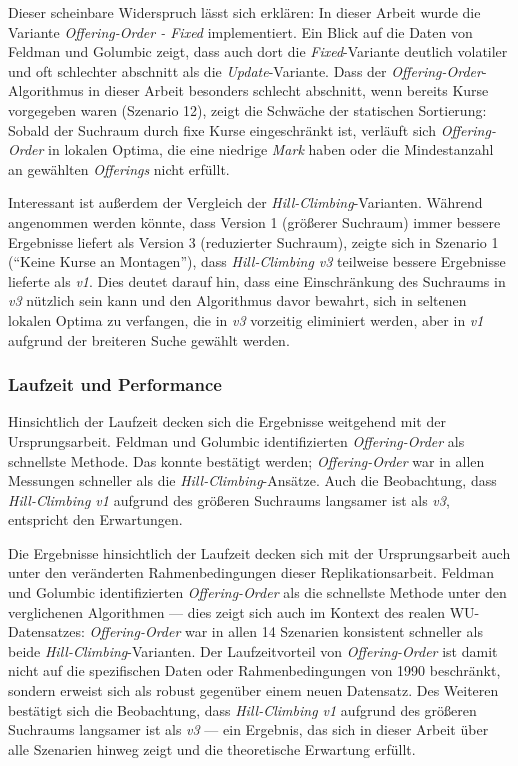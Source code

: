 Dieser scheinbare Widerspruch lässt sich erklären: In dieser Arbeit wurde die Variante \textit{Offering-Order - Fixed} implementiert. Ein Blick auf die Daten von Feldman und Golumbic zeigt, dass auch dort die \textit{Fixed}-Variante deutlich volatiler und oft schlechter abschnitt als die \textit{Update}-Variante. Dass der \textit{Offering-Order}-Algorithmus in dieser Arbeit besonders schlecht abschnitt, wenn bereits Kurse vorgegeben waren (Szenario 12), zeigt die Schwäche der statischen Sortierung: Sobald der Suchraum durch fixe Kurse eingeschränkt ist, verläuft sich \textit{Offering-Order} in lokalen Optima, die eine niedrige \textit{Mark} haben oder die Mindestanzahl an gewählten \textit{Offerings} nicht erfüllt.

Interessant ist außerdem der Vergleich der \textit{Hill-Climbing}-Varianten. Während angenommen werden könnte, dass Version 1 (größerer Suchraum) immer bessere Ergebnisse liefert als Version 3 (reduzierter Suchraum), zeigte sich in Szenario 1 (\enquote{Keine Kurse an Montagen}), dass \textit{Hill-Climbing v3} teilweise bessere Ergebnisse lieferte als \textit{v1}. Dies deutet darauf hin, dass eine Einschränkung des Suchraums in \textit{v3} nützlich sein kann und den Algorithmus davor bewahrt, sich in seltenen lokalen Optima zu verfangen, die in \textit{v3} vorzeitig eliminiert werden, aber in \textit{v1} aufgrund der breiteren Suche gewählt werden.


\subsubsection{Laufzeit und Performance}

Hinsichtlich der Laufzeit decken sich die Ergebnisse weitgehend mit der Ursprungsarbeit. Feldman und Golumbic identifizierten \textit{Offering-Order} als schnellste Methode. Das konnte bestätigt werden; \textit{Offering-Order} war in allen Messungen schneller als die \textit{Hill-Climbing}-Ansätze. Auch die Beobachtung, dass \textit{Hill-Climbing v1} aufgrund des größeren Suchraums langsamer ist als \textit{v3}, entspricht den Erwartungen.

Die Ergebnisse hinsichtlich der Laufzeit decken sich mit der Ursprungsarbeit auch unter den veränderten Rahmenbedingungen dieser Replikationsarbeit. Feldman und Golumbic \cite{feldmangolumbic} identifizierten \textit{Offering-Order} als die schnellste Methode unter den verglichenen Algorithmen --- dies zeigt sich auch im Kontext des realen WU-Datensatzes: \textit{Offering-Order} war in allen 14 Szenarien konsistent schneller als beide \textit{Hill-Climbing}-Varianten. Der Laufzeitvorteil von \textit{Offering-Order} ist damit nicht auf die spezifischen Daten oder Rahmenbedingungen von 1990 beschränkt, sondern erweist sich als robust gegenüber einem neuen Datensatz.
Des Weiteren bestätigt sich die Beobachtung, dass \textit{Hill-Climbing v1} aufgrund des größeren Suchraums langsamer ist als \textit{v3} --- ein Ergebnis, das sich in dieser Arbeit über alle Szenarien hinweg zeigt und die theoretische Erwartung erfüllt.




